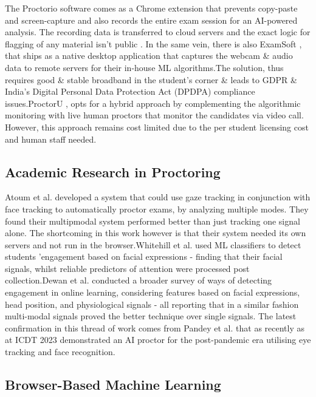 \documentclass[runningheads]{llncs}
\begin{document}
The Proctorio \cite{proctorio2023} software comes as a Chrome extension that prevents copy-paste and screen-capture and also records the entire exam session for an AI-powered analysis. The recording data is transferred to cloud servers and the exact logic for flagging of any material isn't public \cite{swauger2020}. In the same vein, there is also ExamSoft \cite{examsoft2023}, that ships as a native desktop application that captures the webcam \& audio data to remote servers for their in-house ML algorithms.The solution, thus requires good \& stable broadband in the student's corner \& leads to GDPR \& India's Digital Personal Data Protection Act (DPDPA) \cite{dpdpa2023} compliance issues.ProctorU \cite{proctoru2023}, opts for a hybrid approach by complementing the algorithmic monitoring with live human proctors that monitor the candidates via video call. However, this approach remains cost limited due to the per student licensing cost and human staff needed.

\subsection{Academic Research in Proctoring}

Atoum et al. \cite{atoum2017} developed a system that could use gaze tracking in conjunction with face tracking to automatically proctor exams, by analyzing multiple modes. They found their multipmodal system performed better than just tracking one signal alone. The shortcoming in this work however is that their system needed its own servers and not run in the browser.Whitehill et al. \cite{whitehill2014} used ML classifiers to detect students 'engagement based on facial expressions - finding that their facial signals, whilst reliable predictors of attention were processed post collection.Dewan et al. \cite{dewan2019} conducted a broader survey of ways of detecting engagement in online learning, considering features based on facial expressions, head position, and physiological signals - all reporting that in a similar fashion multi-modal signals proved the better technique over single signals. The latest confirmation in this thread of work comes from Pandey et al. \cite{pandey2023} that as recently as at ICDT 2023 demonstrated an AI proctor for the post-pandemic era utilising eye tracking and face recognition.

\subsection{Browser-Based Machine Learning}
\end{document}
